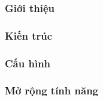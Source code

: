 \subsubsection{Giới thiệu}
\subsubsection{Kiến trúc}
\subsubsection{Cấu hình}
\subsubsection{Mở rộng tính năng}